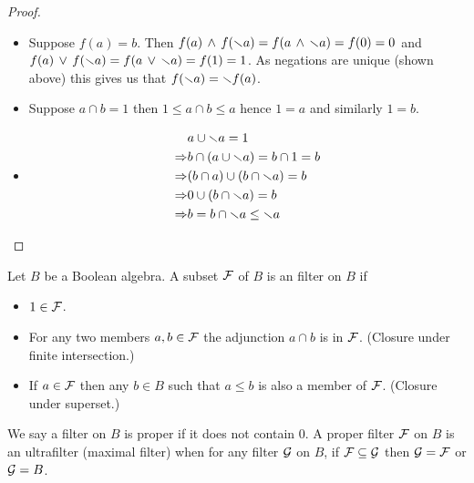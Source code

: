 \begin{proof}
\begin{itemize}
        \item Suppose $f(a) = b$.
            Then $f(a) \, \land \, f(\smallsetminus a) = f(a \, \land \, \smallsetminus a) = f(0) = 0$
            and $f(a) \, \lor \, f(\smallsetminus a) = f(a \, \lor \, \smallsetminus a) = f(1) = 1$.
            As negations are unique (shown above) 
            this gives us that $f(\smallsetminus a) = \smallsetminus f(a)$.
        \item Suppose $a \cap b = 1$ then $1 \leq a \cap b \leq a$ hence $1 = a$
            and similarly $1 = b$.
        \item\begin{align*}
                &a \cup \smallsetminus a = 1\\
                \Rightarrow & b \cap (a \cup \smallsetminus a) = b \cap 1 = b\\
                \Rightarrow & (b \cap a) \cup (b \cap \smallsetminus a) = b\\
                \Rightarrow & 0 \cup (b \cap \smallsetminus a) = b\\
                \Rightarrow & b = b \cap \smallsetminus a \leq \smallsetminus a
            \end{align*}
    \end{itemize}
\end{proof}


\begin{dfn}
    Let $B$ be a Boolean algebra.
    A subset $\mathcal{F}$ of $B$ is an filter on $B$ if
    \begin{itemize}
        \item $1 \in \mathcal{F}$.
        \item For any two members $a,b \in \mathcal{F}$ the adjunction
            $a \cap b$ is in $\mathcal{F}$. (Closure under finite intersection.)
        \item If $a \in \mathcal{F}$ then any $b \in B$ 
            such that $a \leq b$ is also a member of $\mathcal{F}$. 
            (Closure under superset.)
    \end{itemize}
    We say a filter on $B$ is proper if it does not contain $0$.
    A proper filter $\mathcal{F}$ on $B$ is an ultrafilter (maximal filter) when
    for any filter $\mathcal{G}$ on $B$, if $\mathcal{F} \subseteq \mathcal{G}$ then $\mathcal{G} = \mathcal{F}$ 
    or $\mathcal{G} = B$.
\end{dfn}


